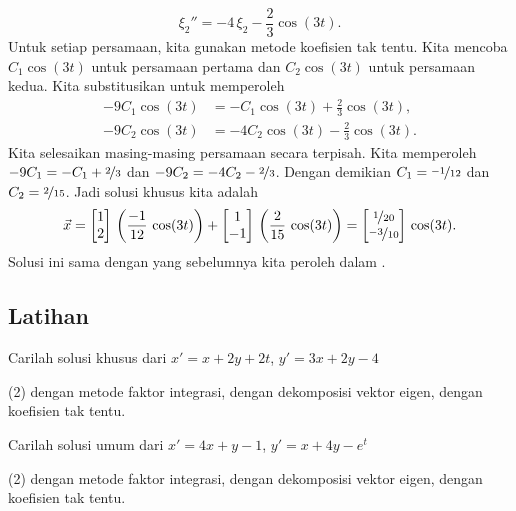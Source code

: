 \begin{example}
\begin{equation*}
\xi_2'' = -4 \, \xi_2 - \frac{2}{3} \cos (3t) .
\end{equation*}
Untuk setiap persamaan, kita gunakan metode koefisien tak tentu.
Kita 
mencoba $C_1 \cos (3t)$ untuk persamaan pertama dan $C_2 \cos (3t)$ untuk persamaan
kedua.  Kita substitusikan untuk memperoleh
\begin{align*}
- 9 C_1 \cos (3t) & = - C_1 \cos (3t) + \frac{2}{3} \cos (3t) , \\
- 9 C_2 \cos (3t) & = - 4 C_2 \cos (3t) - \frac{2}{3} \cos (3t) .
\end{align*}
Kita selesaikan 
masing-masing persamaan secara terpisah.  Kita memperoleh
$- 9 C_1 = - C_1 + \nicefrac{2}{3}$ dan
$- 9 C_2 = - 4C_2 - \nicefrac{2}{3}$.  Dengan demikian $C_1 = \nicefrac{-1}{12}$
dan $C_2 = \nicefrac{2}{15}$.
Jadi solusi khusus kita adalah
\begin{equation*}
\vec{x} =
\begin{bmatrix} 1 \\
2 \end{bmatrix} \,
\left( \frac{-1}{12} \, \cos (3t) \right)
+
\begin{bmatrix} 1 \\
-1 \end{bmatrix} \,
\left( \frac{2}{15} \, \cos (3t) \right)
=
\begin{bmatrix} \nicefrac{1}{20} \\
\nicefrac{-3}{10} \end{bmatrix} \,
\cos (3t) .
\end{equation*}
Solusi ini sama dengan yang sebelumnya kita peroleh dalam .
\end{example}

\subsection{Latihan}

\begin{exercise}
Carilah solusi khusus dari
$x' = x+ 2y +2t$, 
$y' = 3x + 2y -4$
\begin{tasks}(2)
\task dengan metode faktor integrasi,
\task dengan dekomposisi vektor eigen,
\task dengan koefisien tak tentu.
\end{tasks}
\end{exercise}

\begin{exercise}
Carilah solusi umum dari
$x' = 4x+ y -1$, 
$y' = x + 4y -e^t$
\begin{tasks}(2)
\task dengan metode faktor integrasi,
\task dengan dekomposisi vektor eigen,
\task dengan koefisien tak tentu.
\end{tasks}
\end{exercise}

